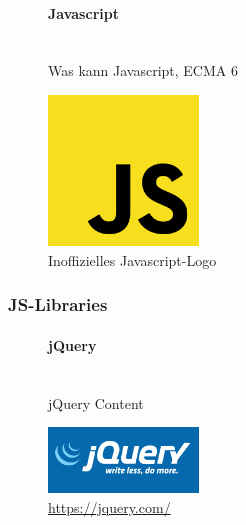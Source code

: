 \documentclass[a4paper]{spie}  %
\begin{document}
\begin{figure}[H]
\begin{minipage}[t]{0.4\textwidth}
\vspace{0pt}
\paragraph{Javascript}\mbox{}\\
Was kann Javascript, ECMA 6
\end{minipage}
\hfill
\begin{minipage}[t]{0.5\textwidth}
\vspace{0pt}
		\includegraphics[width=4cm, right]{./images/software/Unofficial_JavaScript_logo_2}
		\caption{Inoffizielles Javascript-Logo}
		\label{fig:test2}
\end{minipage}
\end{figure}

\subsubsection{JS-Libraries}

\begin{figure}[H]
\begin{minipage}[t]{0.4\textwidth}
\vspace{0pt}
\paragraph{jQuery}\mbox{}\\
jQuery Content
\end{minipage}
\hfill
\begin{minipage}[t]{0.5\textwidth}
\vspace{0pt}
		\includegraphics[width=4cm, right]{./images/software/jquery}
		\caption{\url{https://jquery.com/}}
		\label{fig:test2}
\end{minipage}
\end{figure}
\end{document}
